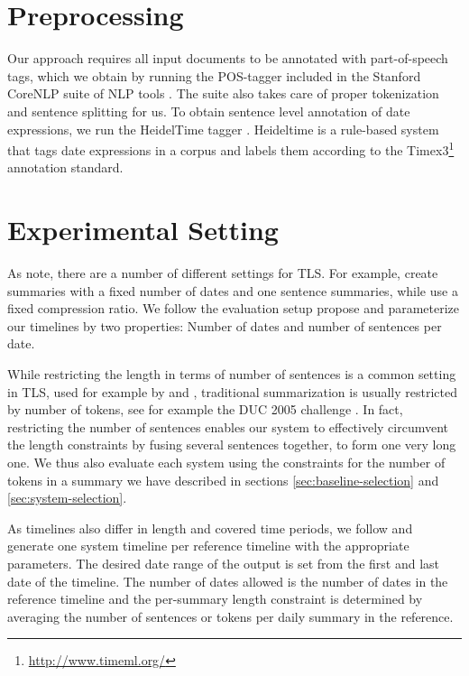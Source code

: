 \documentclass[a4paper,BCOR=10mm]{report}
\numberwithin{lemma}{chapter}
\numberwithin{definition}{chapter}
\begin{document}
\section{Preprocessing}

Our approach requires all input documents to be annotated with part-of-speech tags, which we obtain by running the POS-tagger included in the Stanford CoreNLP suite of NLP tools \citep{stanford-corenlp}. The suite also takes care of proper tokenization and sentence splitting for us.
To obtain sentence level annotation of date expressions, we run the HeidelTime tagger \citep{heideltime}. Heideltime is a rule-based system that tags date expressions in a corpus and labels them according to the Timex3\footnote{\url{http://www.timeml.org/}} annotation standard.

\section{Experimental Setting} \label{sec:setup-settings}

As \citet{markert} note, there are a number of different settings for TLS.
For example, \citet{chieu} create summaries with a fixed number of dates and one sentence summaries, while \citet{yan-trans} use a fixed compression ratio.
We follow the evaluation setup \citeauthor{markert} propose and parameterize our timelines by two properties: Number of dates and number of sentences per date.

While restricting the length in terms of number of sentences is a common setting in TLS, used for example by \citet{chieu} and \citet{yan-trans}, traditional summarization is usually restricted by number of tokens, see for example the DUC 2005 challenge \citep{duc2005}. In fact, restricting the number of sentences enables our system to effectively circumvent the length constraints by fusing several sentences together, to form one very long one.
We thus also evaluate each system using the constraints for the number of tokens in a summary we have described in sections \ref{sec:baseline-selection} and \ref{sec:system-selection}.

As timelines also differ in length and covered time periods, we follow \citet{markert} and generate one system timeline per reference timeline with the appropriate parameters. The desired date range of the output is set from the first and last date of the timeline. The number of dates allowed is the number of dates in the reference timeline and the per-summary length constraint is determined by averaging the number of sentences or tokens per daily summary in the reference.
\end{document}
